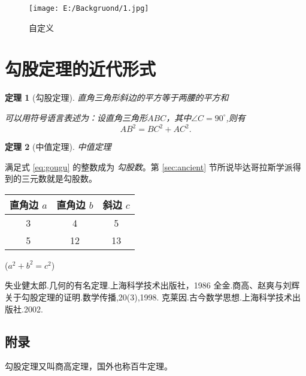 \documentclass{ctexart}[UTF-8]        %
\newtheorem{thm}{定理}               %
\newcommand\degree{^\circ}           %
\begin{document}
\begin{figure}[!ht]\centering
    \texttt{[image: E:/Backgruond/1.jpg]}
    \caption{自定义}
\end{figure}


\clearpage
\section{勾股定理的近代形式}



\begin{thm}[\small 勾股定理]    %
    \small 直角三角形斜边的平方等于两腰的平方和

    \small 可以用符号语言表述为：设直角三角形$ABC$，其中$\angle C=90 \degree$,则有
    \begin{equation}\label{eq:gougu}   %
        AB^2=BC^2+AC^2.
    \end{equation}
\end{thm}


\begin{thm}[\small 中值定理] 
    \small 中值定理
\end{thm}

\small 满足式 \eqref{eq:gougu} 的整数成为 \emph{勾股数}。第 \ref{sec:ancient} 节所说毕达哥拉斯学派得到的三元数就是勾股数。

\vspace{3mm}    %
\begin{tabular}{|c|c|c|}\hline   %
    \small 直角边 $a$ & 直角边 $b$ & 斜边 $c$ \\\hline  %
    3 & 4 & 5 \\\hline
    5 & 12 & 13 \\\hline
\end{tabular}
\small($a^2+b^2=c^2$)

\clearpage
\begin{thebibliography}{99}   %
     失业健太郎.几何的有名定理.上海科学技术出版社，1986
    全金.商高、赵爽与刘辉关于勾股定理的证明.数学传播,20(3),1998.
    克莱因.古今数学思想.上海科学技术出版社.2002.
\end{thebibliography}



\begin{appendix}          %
\section{附录} %
    \small 勾股定理又叫商高定理，国外也称百牛定理。    
\end{appendix}
\end{document}
